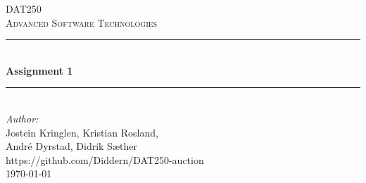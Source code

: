 \begin{titlepage}


\newcommand{\HRule}{\rule{\linewidth}{0.5mm}} %

\center %
 

\textsc{\Large DAT250}\\[0.5cm] %
\textsc{\large Advanced Software Technologies}\\[0.5cm] %


\HRule \\[0.4cm]
{ \huge \bfseries Assignment 1}\\[0.4cm] %
\HRule \\[1.5cm]
 

\Large \emph{Author:}\\
Jostein Kringlen, Kristian Rosland, \\André Dyrstad, Didrik Sæther\\[3cm] %


{\large https://github.com/Diddern/DAT250-auction}\\[3cm]
{\large \today}\\[3cm] %


 

\vfill %

\end{titlepage}

